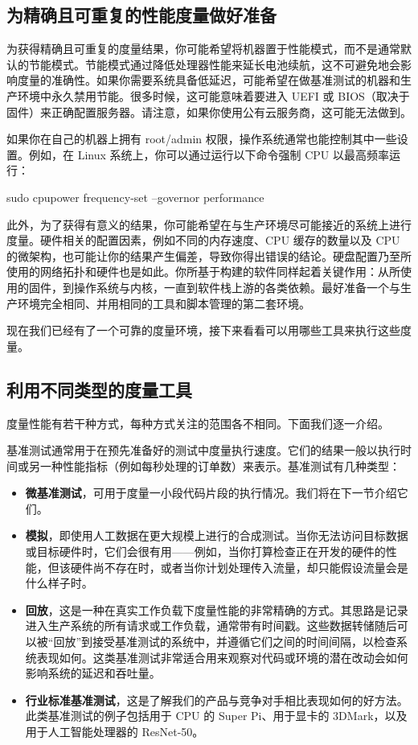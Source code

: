 \subsection{为精确且可重复的性能度量做好准备}

\label{idx:1159}
为获得精确且可重复的度量结果，你可能希望将机器置于性能模式，而不是通常默认的节能模式。节能模式通过降低处理器性能来延长电池续航，这不可避免地会影响度量的准确性。如果你需要系统具备低延迟，可能希望在做基准测试的机器和生产环境中永久禁用节能。很多时候，这可能意味着要进入 UEFI 或 BIOS（取决于固件）来正确配置服务器。请注意，如果你使用公有云服务商，这可能无法做到。

如果你在自己的机器上拥有 root/admin 权限，操作系统通常也能控制其中一些设置。例如，在 Linux 系统上，你可以通过运行以下命令强制 CPU 以最高频率运行：

\begin{codebox}[text]
sudo cpupower frequency-set --governor performance
\end{codebox}

此外，为了获得有意义的结果，你可能希望在与生产环境尽可能接近的系统上进行度量。硬件相关的配置因素，例如不同的内存速度、CPU 缓存的数量以及 CPU 的微架构，也可能让你的结果产生偏差，导致你得出错误的结论。硬盘配置乃至所使用的网络拓扑和硬件也是如此。你所基于构建的软件同样起着关键作用：从所使用的固件，到操作系统与内核，一直到软件栈上游的各类依赖。最好准备一个与生产环境完全相同、并用相同的工具和脚本管理的第二套环境。

现在我们已经有了一个可靠的度量环境，接下来看看可以用哪些工具来执行这些度量。

\subsection{利用不同类型的度量工具}

度量性能有若干种方式，每种方式关注的范围各不相同。下面我们逐一介绍。

\label{idx:1160}
基准测试通常用于在预先准备好的测试中度量执行速度。它们的结果一般以执行时间或另一种性能指标（例如每秒处理的订单数）来表示。基准测试有几种类型：

\begin{itemize}
\item \textbf{微基准测试}，可用于度量一小段代码片段的执行情况。我们将在下一节介绍它们。
\item \textbf{模拟}，即使用人工数据在更大规模上进行的合成测试。当你无法访问目标数据或目标硬件时，它们会很有用——例如，当你打算检查正在开发的硬件的性能，但该硬件尚不存在时，或者当你计划处理传入流量，却只能假设流量会是什么样子时。
\item \textbf{回放}，这是一种在真实工作负载下度量性能的非常精确的方式。其思路是记录进入生产系统的所有请求或工作负载，通常带有时间戳。这些数据转储随后可以被“回放”到接受基准测试的系统中，并遵循它们之间的时间间隔，以检查系统表现如何。这类基准测试非常适合用来观察对代码或环境的潜在改动会如何影响系统的延迟和吞吐量。
\item \textbf{行业标准基准测试}，这是了解我们的产品与竞争对手相比表现如何的好方法。此类基准测试的例子包括用于 CPU 的 Super Pi、用于显卡的 3DMark，以及用于人工智能处理器的 ResNet-50。
\end{itemize}

